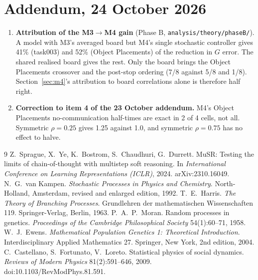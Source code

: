 \documentclass[10pt,a4paper]{article}
\begin{document}
\section*{Addendum, 24 October 2026}
\begin{enumerate}
\item \textbf{Attribution of the M3$\to$M4 gain} (Phase B, \nolinkurl{analysis/theory/phaseB/}). A model with M3's
  averaged board but M4's single stochastic controller gives 41\% (task003) and 52\% (Object Placements) of the
  reduction in $G$ error. The shared realised board gives the rest. Only the board brings the Object Placements crossover
  and the post-stop ordering (7/8 against 5/8 and 1/8). Section~\ref{sec:m4}'s attribution to board correlations alone
  is therefore half right.
\item \textbf{Correction to item 4 of the 23 October addendum.} M4's Object Placements no-communication half-times are
  exact in 2 of 4 cells, not all. Symmetric $\rho=0.25$ gives 1.25 against 1.0, and symmetric $\rho=0.75$ has no effect
  to halve.
\end{enumerate}

\begin{thebibliography}{9}\small
{} Z.~Sprague, X.~Ye, K.~Bostrom, S.~Chaudhuri, G.~Durrett. MuSR: Testing the limits of
chain-of-thought with multistep soft reasoning. In \emph{International Conference on Learning Representations
(ICLR)}, 2024. arXiv:2310.16049.
 N.~G.~van Kampen. \emph{Stochastic Processes in Physics and Chemistry}. North-Holland, Amsterdam, revised and enlarged
edition, 1992.
 T.~E.~Harris. \emph{The Theory of Branching Processes}. Grundlehren der mathematischen Wissenschaften 119.
Springer-Verlag, Berlin, 1963.
 P.~A.~P.~Moran. Random processes in genetics. \emph{Proceedings of the Cambridge Philosophical Society}
54(1):60--71, 1958.
 W.~J.~Ewens. \emph{Mathematical Population Genetics 1: Theoretical Introduction}. Interdisciplinary Applied
Mathematics 27. Springer, New York, 2nd edition, 2004.
 C.~Castellano, S.~Fortunato, V.~Loreto. Statistical physics of social dynamics. \emph{Reviews of
Modern Physics} 81(2):591--646, 2009. doi:10.1103/RevModPhys.81.591.
\end{thebibliography}
\end{document}
